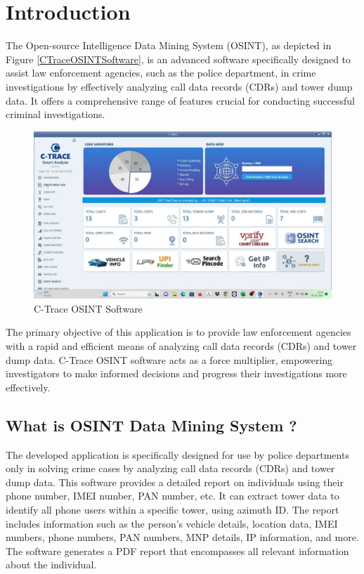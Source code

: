 \chapter{Introduction}
\justify

The Open-source Intelligence Data Mining System (OSINT), as depicted in Figure \ref*{CTraceOSINTSoftware}, is an advanced software specifically designed to assist law enforcement agencies, such as the police department, in crime investigations by effectively analyzing call data records (CDRs) and tower dump data. It offers a comprehensive range of features crucial for conducting successful criminal investigations.

\begin{figure}
    \centering
    \includegraphics[width=1\linewidth]{Media/maxresdefault.jpg}
    \caption{C-Trace OSINT Software}
    \label{fig:CTraceOSINTSoftware}
\end{figure}

The primary objective of this application is to provide law enforcement agencies with a rapid and efficient means of analyzing call data records (CDRs) and tower dump data. C-Trace OSINT software acts as a force multiplier, empowering investigators to make informed decisions and progress their investigations more effectively.

\section{What is OSINT Data Mining System ?}

The developed application is specifically designed for use by police departments only in solving crime cases by analyzing call data records (CDRs) and tower dump data. This software provides a detailed report on individuals using their phone number, IMEI number, PAN number, etc. It can extract tower data to identify all phone users within a specific tower, using azimuth ID. The report includes information such as the person's vehicle details, location data, IMEI numbers, phone numbers, PAN numbers, MNP details, IP information, and more. The software generates a PDF report that encompasses all relevant information about the individual.

